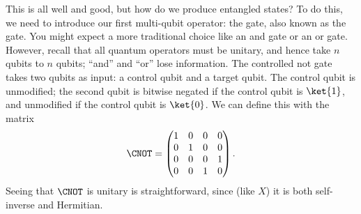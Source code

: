 This is all well and good, but how do we produce entangled states?  To do this,
we need to introduce our first multi-qubit operator: the 
gate, also known as the  gate.  You might expect a more traditional
choice like an and gate or an or gate.  However, recall that all quantum
operators must be unitary, and hence take $n$ qubits to $n$ qubits; ``and'' and
``or'' lose information.  The controlled not gate takes two qubits as input: a
control qubit and a target qubit.  The control qubit is unmodified; the second
qubit is bitwise negated if the control qubit is $\ket{1}$, and unmodified if
the control qubit is $\ket{0}$.  We can define this with the matrix \[
  \CNOT = \begin{pmatrix} 1 & 0 & 0 & 0 \\
                          0 & 1 & 0 & 0 \\
                          0 & 0 & 0 & 1 \\
                          0 & 0 & 1 & 0 \end{pmatrix}.
\] Seeing that $\CNOT$ is unitary is straightforward, since (like $X$) it is
both self-inverse and Hermitian.

